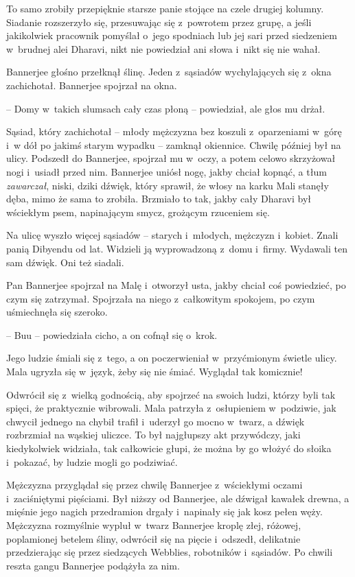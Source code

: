 \documentclass[oneside,polish,11pt,rmheadings]{mwbk}
\begin{document}
To samo zrobiły przepięknie starsze panie stojące na czele drugiej kolumny. Siadanie rozszerzyło się, przesuwając się z~powrotem przez grupę, a jeśli jakikolwiek pracownik pomyślał o~jego spodniach lub jej sari przed siedzeniem w~brudnej alei Dharavi, nikt nie powiedział ani słowa i~nikt się nie wahał.

Bannerjee głośno przełknął ślinę. Jeden z~sąsiadów wychylających się z~okna zachichotał. Bannerjee spojrzał na okna. 

-- Domy w~takich slumsach cały czas płoną -- powiedział, ale głos mu drżał. 

Sąsiad, który zachichotał -- młody mężczyzna bez koszuli z~oparzeniami w~górę i~w dół po jakimś starym wypadku -- zamknął okiennice. Chwilę później był na ulicy. Podszedł do Bannerjee, spojrzał mu w~oczy, a potem celowo skrzyżował nogi i~usiadł przed nim. Bannerjee uniósł nogę, jakby chciał kopnąć, a tłum \textit{zawarczał}, niski, dziki dźwięk, który sprawił, że włosy na karku Mali stanęły dęba, mimo że sama to zrobiła. Brzmiało to tak, jakby cały Dharavi był wściekłym psem, napinającym smycz, grożącym rzuceniem się.

Na ulicę wyszło więcej sąsiadów -- starych i~młodych, mężczyzn i~kobiet. Znali panią Dibyendu od lat. Widzieli ją wyprowadzoną z~domu i~firmy. Wydawali ten sam dźwięk. Oni też siadali.

Pan Bannerjee spojrzał na Malę i~otworzył usta, jakby chciał coś powiedzieć, po czym się zatrzymał. Spojrzała na niego z~całkowitym spokojem, po czym uśmiechnęła się szeroko. 

-- Buu -- powiedziała cicho, a on cofnął się o~krok.

Jego ludzie śmiali się z~tego, a on poczerwieniał w~przyćmionym świetle ulicy. Mala ugryzła się w~język, żeby się nie śmiać. Wyglądał tak komicznie!

Odwrócił się z~wielką godnością, aby spojrzeć na swoich ludzi, którzy byli tak spięci, że praktycznie wibrowali. Mala patrzyła z~osłupieniem w~podziwie, jak chwycił jednego na chybił trafił i~uderzył go mocno w~twarz, a dźwięk rozbrzmiał na wąskiej uliczce. To był najgłupszy akt przywódczy, jaki kiedykolwiek widziała, tak całkowicie głupi, że można by go włożyć do słoika i~pokazać, by ludzie mogli go podziwiać.

Mężczyzna przyglądał się przez chwilę Bannerjee z~wściekłymi oczami i~zaciśniętymi pięściami. Był niższy od Bannerjee, ale dźwigał kawałek drewna, a mięśnie jego nagich przedramion drgały i~napinały się jak kosz pełen węży. Mężczyzna rozmyślnie wypluł w~twarz Bannerjee kroplę złej, różowej, poplamionej betelem śliny, odwrócił się na pięcie i~odszedł, delikatnie przedzierając się przez siedzących Webblies, robotników i~sąsiadów. Po chwili reszta gangu Bannerjee podążyła za nim.
\end{document}

